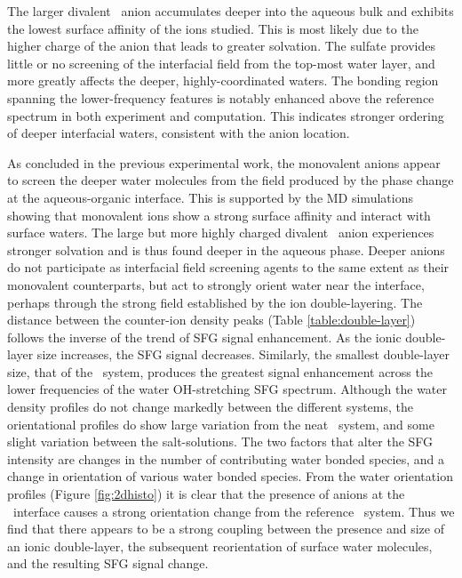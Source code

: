 The larger divalent \sul~anion accumulates deeper into the aqueous bulk and exhibits the lowest surface affinity of the ions studied. This is most likely due to the higher charge of the anion that leads to greater solvation. The sulfate provides little or no screening of the interfacial field from the top-most water layer, and more greatly affects the deeper, highly-coordinated waters. The bonding region spanning the lower-frequency features is notably enhanced above the reference spectrum in both experiment and computation. This indicates stronger ordering of deeper interfacial waters, consistent with the anion location.

As concluded in the previous experimental work, the monovalent anions appear to screen the deeper water molecules from the field produced by the phase change at the aqueous-organic interface. This is supported by the MD simulations showing that monovalent ions show a strong surface affinity and interact with surface waters. The large but more highly charged divalent \sul~anion experiences stronger solvation and is thus found deeper in the aqueous phase. Deeper anions do not participate as interfacial field screening agents to the same extent as their monovalent counterparts, but act to strongly orient water near the interface, perhaps through the strong field established by the ion double-layering. The distance between the counter-ion density peaks (Table \ref{table:double-layer}) follows the inverse of the trend of SFG signal enhancement. As the ionic double-layer size increases, the SFG signal decreases. Similarly, the smallest double-layer size, that of the \sul~system, produces the greatest signal enhancement across the lower frequencies of the water OH-stretching SFG spectrum. Although the water density profiles do not change markedly between the different systems, the orientational profiles do show large variation from the neat \ctcwat~system, and some slight variation between the salt-solutions. The two factors that alter the SFG intensity are changes in the number of contributing water bonded species, and a change in orientation of various water bonded species. From the water orientation profiles (Figure \ref{fig:2dhisto}) it is clear that the presence of anions at the \ctcwat~interface causes a strong orientation change from the reference \ctcwat~system. Thus we find that there appears to be a strong coupling between the presence and size of an ionic double-layer, the subsequent reorientation of surface water molecules, and the resulting SFG signal change.
